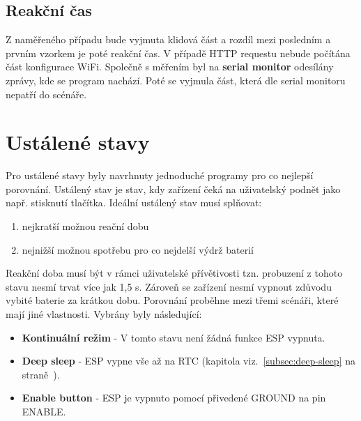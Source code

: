 \documentclass[a4paper, 12pt]{report}
\begin{document}
    \subsection{Reakční čas}
    \label{subsec:wifi-reakce}
    Z naměřeného případu bude vyjmuta klidová část a rozdíl mezi posledním a prvním vzorkem je poté reakční čas.
    V případě HTTP requestu nebude počítána část konfigurace WiFi.
    Společně s měřením byl na \textbf{serial monitor} odesílány zprávy, kde se program nachází.
    Poté se vyjmula část, která dle serial monitoru nepatří do scénáře.


    \section{Ustálené stavy}
    Pro ustálené stavy byly navrhnuty jednoduché programy pro co nejlepší porovnání.
    Ustálený stav je stav, kdy zařízení čeká na uživatelský podnět jako např. stisknutí tlačítka.
    Ideální ustálený stav musí splňovat:
    \begin{enumerate}
        \item nejkratší možnou reační dobu
        \item nejnižší možnou spotřebu pro co nejdelší výdrž baterií
    \end{enumerate}
    Reakční doba musí být v rámci uživatelské přívětivosti tzn. probuzení z tohoto stavu nesmí trvat více jak 1,5 \si{s}.
    Zároveň se zařízení nesmí vypnout zdůvodu vybité baterie za krátkou dobu. Porovnání proběhne mezi třemi scénáři, které mají jiné vlastnosti.
    Vybrány byly následující:
    \begin{itemize}
        \item \textbf{Kontinuální režim} - V tomto stavu není žádná funkce ESP vypnuta.
        \item \textbf{Deep sleep} - ESP vypne vše až na RTC (kapitola viz.~\ref{subsec:deep-sleep} na straně~\pageref{subsec:deep-sleep}).
        \item \textbf{Enable button} - ESP je vypnuto pomocí přivedené GROUND na pin ENABLE\@.
    \end{itemize}
\end{document}

